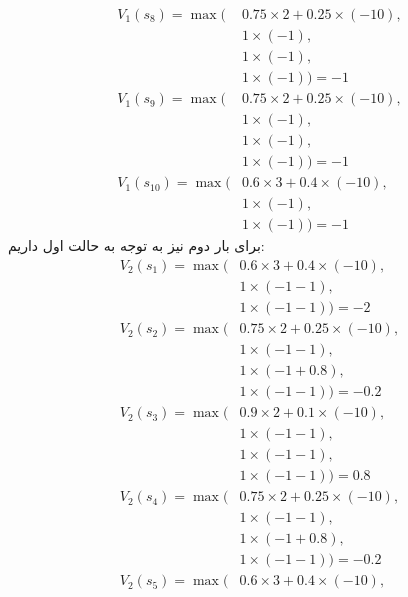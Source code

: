 \begin{enumerate}
\begin{align*}
        V_1(s_8) = \operatorname{max}(
            &0.75 \times 2 + 0.25 \times (-10),\\
            &1 \times (-1),\\
            &1 \times (-1),\\
            &1 \times (-1)
        ) = -1\\
        V_1(s_9) = \operatorname{max}(
            &0.75 \times 2 + 0.25 \times (-10),\\
            &1 \times (-1),\\
            &1 \times (-1),\\
            &1 \times (-1)
        ) = -1\\
        V_1(s_{10}) = \operatorname{max}(
            &0.6 \times 3 + 0.4 \times (-10),\\
            &1 \times (-1),\\
            &1 \times (-1)
        ) = -1
    \end{align*}
    برای بار دوم نیز به توجه به حالت اول داریم:
    \begin{align*}
        V_2(s_1) = \operatorname{max}(
            &0.6 \times 3 + 0.4 \times (-10),\\
            &1 \times (-1 - 1),\\
            &1 \times (-1 - 1)
        ) = -2\\
        V_2(s_2) = \operatorname{max}(
            &0.75 \times 2 + 0.25 \times (-10),\\
            &1 \times (-1 - 1),\\
            &1 \times (-1 + 0.8),\\
            &1 \times (-1 - 1)
        ) = -0.2\\
        V_2(s_3) = \operatorname{max}(
            &0.9 \times 2 + 0.1 \times (-10),\\
            &1 \times (-1 - 1),\\
            &1 \times (-1 - 1),\\
            &1 \times (-1 - 1)
        ) = 0.8\\
        V_2(s_4) = \operatorname{max}(
            &0.75 \times 2 + 0.25 \times (-10),\\
            &1 \times (-1 - 1),\\
            &1 \times (-1 + 0.8),\\
            &1 \times (-1 - 1)
        ) = -0.2\\
        V_2(s_5) = \operatorname{max}(
            &0.6 \times 3 + 0.4 \times (-10),\\

\end{align*}
\end{enumerate}
